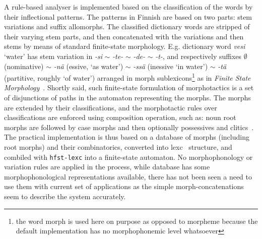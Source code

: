 \documentclass[a4paper,12pt]{article}
\begin{document}
A rule-based analyser is implemented based on the classification of the words
by their inflectional patterns. The patterns in Finnish are based on two parts:
stem variations and suffix allomorphs. The classified dictionary words are
stripped of their varying stem parts, and then concatenated with the variations
and then stems by means of standard finite-state morphology. E.g. dictionary
word \emph{vesi} `water' has stem variation in \emph{-si} $\sim$ \emph{-te-}
$\sim$ \emph{-de-} $\sim$ \emph{-t-}, and respectively suffixes $\emptyset$
(nominative) $\sim$ \emph{-nä} (essive, `as water') $\sim$ \emph{-ssä}
(inessive `in water')  $\sim$ \emph{-tä} (partitive, roughly `of water')
arranged in morph sublexicons\footnote{the word morph is used here on purpose
    as opposed to morpheme because the default implementation has no
morphophonemic level whatsoever} as in \emph{Finite State
Morphology}~\citep{beesley2003finite}. Shortly said, such finite-state
formulation of morphotactics is a set of disjunctions of paths in the automaton
representing the morphs. The morphs are extended by their classifications, and
the morphotactic rules over classifications are enforced using composition
operation, such as: noun root morphs are followed by case morphs and then
optionally possessives and clitics~\citep{hfst2012}. The practical
implementation is thus based on a database of morphs (including root morphs)
and their combinatorics, converted into lexc~\citep{beesley2003finite}
structure, and combiled with \texttt{hfst-lexc} into a finite-state automaton.
No morphophonology or variation rules are applied in the process, while
database has some morphophonological representations available, there has not
been seen a need to use them with current set of applications as the simple
morph-concatenations seem to describe the system accurately.
\end{document}
